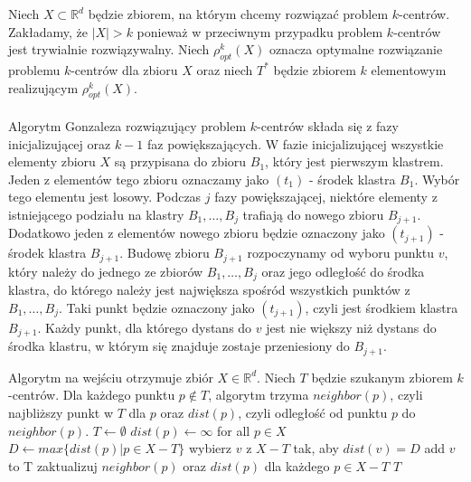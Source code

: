 \noindent
Niech $X \subset \mathbb{R}^{d}$ będzie zbiorem, na którym chcemy rozwiązać problem $k$-centrów.
Zakładamy, że $|X| > k$ ponieważ w przeciwnym przypadku problem $k$-centrów jest trywialnie rozwiązywalny.
Niech $\rho_{opt}^{k}(X)$ oznacza optymalne rozwiązanie problemu $k$-centrów dla zbioru $X$ oraz niech $T^{*}$ będzie zbiorem $k$ elementowym realizującym $\rho_{opt}^{k}(X)$.
\\~\\
Algorytm Gonzaleza rozwiązujący problem $k$-centrów składa się z fazy inicjalizującej oraz $k-1$ faz powiększających.
W fazie inicjalizującej wszystkie elementy zbioru $X$ są przypisana do zbioru $B_{1}$, który jest pierwszym klastrem.
Jeden z elementów tego zbioru oznaczamy jako $(t_{1})$ - środek klastra $B_{1}$.
Wybór tego elementu jest losowy.
Podczas $j$ fazy powiększającej, niektóre elementy z istniejącego podziału na klastry $B_{1}, \dots, B_{j}$ trafiają do nowego zbioru $B_{j+1}$.
Dodatkowo jeden z elementów nowego zbioru będzie oznaczony jako $(t_{j+1})$ - środek klastra $B_{j+1}$.
Budowę zbioru $B_{j+1}$ rozpoczynamy od wyboru punktu $v$, który należy do jednego ze zbiorów $B_{1}, \dots, B_{j}$ oraz jego odległość do środka klastra, do którego należy jest największa spośród wszystkich punktów z $B_{1}, \dots, B_{j}$. 
Taki punkt będzie oznaczony jako $(t_{j+1})$, czyli jest środkiem klastra $B_{j+1}$.
Każdy punkt, dla którego dystans do $v$ jest nie większy niż dystans do środka klastru, w którym się znajduje zostaje przeniesiony do $B_{j+1}$.
\begin{algorithm}
    \caption{}
\begin{algorithmic}
    \State Algorytm na wejściu otrzymuje zbiór $X \in \mathbb{R}^{d}$.
    \State Niech $T$ będzie szukanym zbiorem $k$-centrów.
    \State Dla każdego punktu $p \notin T$, algorytm trzyma $neighbor(p)$, czyli najbliższy punkt w $T$ dla $p$ oraz $dist(p)$, czyli odległość od punktu $p$ do $neighbor(p)$.
        \State $T \leftarrow \emptyset$
        \State $dist(p) \leftarrow \infty$ for all $p \in X$
            \State $D \leftarrow max\{dist(p) | p \in X-T\}$
            \State wybierz $v$ z $X-T$ tak, aby $dist(v) = D$
            \State add $v$ to T
            \State zaktualizuj $neighbor(p)$ oraz $dist(p)$ dla każdego $p \in X-T$
        \EndWhile
    \EndProcedure
    \Return $T$
\end{algorithmic}
\end{algorithm}
